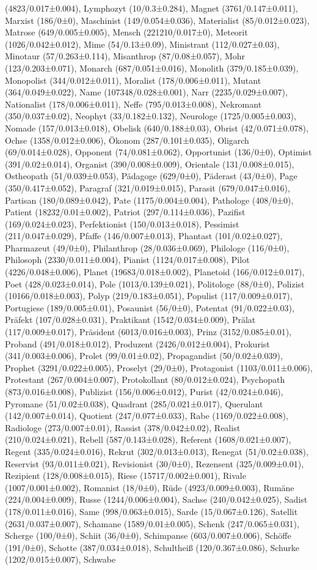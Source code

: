 \begin{styleMoutonText}
(4823/0.017±0.004), Lymphozyt (10/0.3±0.284), Magnet (3761/0.147±0.011), Marxist (186/0±0), Maschinist (149/0.054±0.036), Materialist (85/0.012±0.023), Matrose (649/0.005±0.005), Mensch (221210/0.017±0), Meteorit (1026/0.042±0.012), Mime (54/0.13±0.09), Ministrant (112/0.027±0.03), Minotaur (57/0.263±0.114), Misanthrop (87/0.08±0.057), Mohr (123/0.203±0.071), Monarch (687/0.051±0.016), Monolith (379/0.185±0.039), Monopolist (344/0.012±0.011), Moralist (178/0.006±0.011), Mutant (364/0.049±0.022), Name (107348/0.028±0.001), Narr (2235/0.029±0.007), Nationalist (178/0.006±0.011), Neffe (795/0.013±0.008), Nekromant (350/0.037±0.02), Neophyt (33/0.182±0.132), Neurologe (1725/0.005±0.003), Nomade (157/0.013±0.018), Obelisk (640/0.188±0.03), Obrist (42/0.071±0.078), Ochse (1358/0.012±0.006), Ökonom (287/0.101±0.035), Oligarch (69/0.014±0.028), Opponent (74/0.081±0.062), Opportunist (136/0±0), Optimist (391/0.02±0.014), Organist (390/0.008±0.009), Orientale (131/0.008±0.015), Ostheopath (51/0.039±0.053), Pädagoge (629/0±0), Päderast (43/0±0), Page (350/0.417±0.052), Paragraf (321/0.019±0.015), Parasit (679/0.047±0.016), Partisan (180/0.089±0.042), Pate (1175/0.004±0.004), Pathologe (408/0±0), Patient (18232/0.01±0.002), Patriot (297/0.114±0.036), Pazifist (169/0.024±0.023), Perfektionist (150/0.013±0.018), Pessimist (211/0.047±0.029), Pfaffe (146/0.007±0.013), Phantast (101/0.02±0.027), Pharmazeut (49/0±0), Philanthrop (28/0.036±0.069), Philologe (116/0±0), Philosoph (2330/0.011±0.004), Pianist (1124/0.017±0.008), Pilot (4226/0.048±0.006), Planet (19683/0.018±0.002), Planetoid (166/0.012±0.017), Poet (428/0.023±0.014), Pole (1013/0.139±0.021), Politologe (88/0±0), Polizist (10166/0.018±0.003), Polyp (219/0.183±0.051), Populist (117/0.009±0.017), Portugiese (189/0.005±0.01), Posaunist (56/0±0), Potentat (91/0.022±0.03), Präfekt (107/0.028±0.031), Praktikant (1542/0.034±0.009), Prälat (117/0.009±0.017), Präsident (6013/0.016±0.003), Prinz (3152/0.085±0.01), Proband (491/0.018±0.012), Produzent (2426/0.012±0.004), Prokurist (341/0.003±0.006), Prolet (99/0.01±0.02), Propagandist (50/0.02±0.039), Prophet (3291/0.022±0.005), Proselyt (29/0±0), Protagonist (1103/0.011±0.006), Protestant (267/0.004±0.007), Protokollant (80/0.012±0.024), Psychopath (873/0.016±0.008), Publizist (156/0.006±0.012), Purist (42/0.024±0.046), Pyromane (51/0.02±0.038), Quadrant (285/0.021±0.017), Querulant (142/0.007±0.014), Quotient (247/0.077±0.033), Rabe (1169/0.022±0.008), Radiologe (273/0.007±0.01), Rassist (378/0.042±0.02), Realist (210/0.024±0.021), Rebell (587/0.143±0.028), Referent (1608/0.021±0.007), Regent (335/0.024±0.016), Rekrut (302/0.013±0.013), Renegat (51/0.02±0.038), Reservist (93/0.011±0.021), Revisionist (30/0±0), Rezensent (325/0.009±0.01), Rezipient (128/0.008±0.015), Riese (15717/0.002±0.001), Rivale (1007/0.001±0.002), Romanist (18/0±0), Rüde (4923/0.009±0.003), Rumäne (224/0.004±0.009), Russe (1244/0.006±0.004), Sachse (240/0.042±0.025), Sadist (178/0.011±0.016), Same (998/0.063±0.015), Sarde (15/0.067±0.126), Satellit (2631/0.037±0.007), Schamane (1589/0.01±0.005), Schenk (247/0.065±0.031), Scherge (100/0±0), Schiit (36/0±0), Schimpanse (603/0.007±0.006), Schöffe (191/0±0), Schotte (387/0.034±0.018), Schultheiß (120/0.367±0.086), Schurke (1202/0.015±0.007), Schwabe 
\end{styleMoutonText}
